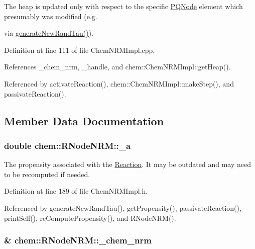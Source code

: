 The heap is updated only with respect to the specific \hyperlink{classchem_1_1PQNode}{P\-Q\-Node} element which presumably was modified (e.\-g. 

via \hyperlink{classchem_1_1RNodeNRM_a33025de761dc8d29928f8e5b1148eff1}{generate\-New\-Rand\-Tau()}). 

Definition at line 111 of file Chem\-N\-R\-M\-Impl.\-cpp.



References \-\_\-chem\-\_\-nrm, \-\_\-handle, and chem\-::\-Chem\-N\-R\-M\-Impl\-::get\-Heap().



Referenced by activate\-Reaction(), chem\-::\-Chem\-N\-R\-M\-Impl\-::make\-Step(), and passivate\-Reaction().



\subsection{Member Data Documentation}
\hypertarget{classchem_1_1RNodeNRM_ae16aa8e75649d855f4b6eae8b00ed1db}{
\subsubsection[{\-\_\-a}]{\setlength{\rightskip}{0pt plus 5cm}double {\bf chem\-::\-R\-Node\-N\-R\-M\-::\-\_\-a}}}\label{classchem_1_1RNodeNRM_ae16aa8e75649d855f4b6eae8b00ed1db}


The propensity associated with the \hyperlink{classchem_1_1Reaction}{Reaction}. It may be outdated and may need to be recomputed if needed. 



Definition at line 189 of file Chem\-N\-R\-M\-Impl.\-h.



Referenced by generate\-New\-Rand\-Tau(), get\-Propensity(), passivate\-Reaction(), print\-Self(), re\-Compute\-Propensity(), and R\-Node\-N\-R\-M().

\hypertarget{classchem_1_1RNodeNRM_acff43a1b27a778b6534bd8010904f821}{
\subsubsection[{\-\_\-chem\-\_\-nrm}]{\& {\bf chem\-::\-R\-Node\-N\-R\-M\-::\-\_\-chem\-\_\-nrm}}}\label{classchem_1_1RNodeNRM_acff43a1b27a778b6534bd8010904f821}


